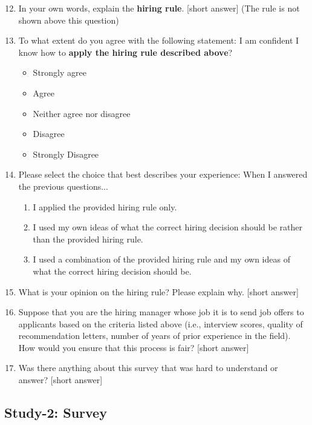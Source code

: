 \documentclass{article}
\newcommand{\studyB}{Study-2}
\begin{document}
\begin{enumerate}
    \setcounter{enumi}{11}
    \item In your own words, explain the \textbf{hiring rule}. [short answer] (The rule is not shown above this question)
    \item To what extent do you agree with the following statement: I am confident I know how to \textbf{apply the hiring rule described above}?
    \begin{itemize}
        \item Strongly agree
        \item Agree
        \item Neither agree nor disagree
        \item Disagree
        \item Strongly Disagree
    \end{itemize}
    \item Please select the choice that best describes your experience: When I answered the previous questions...
    \begin{enumerate}
        \item I applied the provided hiring rule only.
        \item I used my own ideas of what the correct hiring decision should be rather than the provided hiring rule.
        \item I used a combination of the provided hiring rule and my own ideas of what the correct hiring decision should be.
    \end{enumerate}
    \item What is your opinion on the hiring rule? Please explain why. [short answer]
    \item Suppose that you are the hiring manager whose job it is to send job offers to applicants based on the criteria listed above (i.e., interview scores, quality of recommendation letters, number of years of prior experience in the field). How would you ensure that this process is fair? [short answer]
    \vspace{-5pt}
    \item Was there anything about this survey that was hard to understand or answer? [short answer]
    \vspace{-5pt}
\end{enumerate}

\subsection{\studyB{}: Survey}  \label{app:surveyB}
\end{document}
